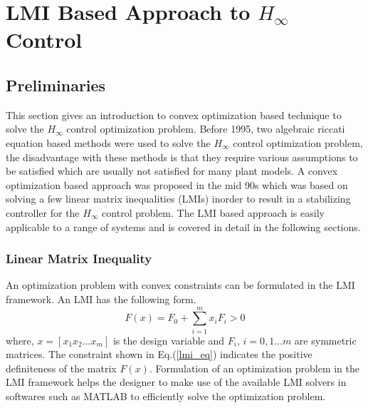 \documentclass[a4paper,12pt]{article}
\begin{document}
\section{LMI Based Approach to $H_{\infty}$ Control}
\subsection{Preliminaries}
This section gives an introduction to  convex optimization based technique to solve the $H_{\infty}$ control optimization problem. Before 1995, two algebraic riccati equation based methods were used to solve the $H_{\infty}$ control optimization problem, the disadvantage with these methods is that they require various assumptions to be satisfied which are usually not satisfied for many plant models. A convex optimization based approach was proposed in the mid 90s which was based on solving a few linear matrix inequalities (LMIs) inorder to result in a stabilizing controller for the $H_{\infty}$ control problem. The LMI based approach is easily applicable to a range of systems and is covered in detail in the following sections.
	\subsubsection{Linear Matrix Inequality}
	An optimization problem with convex constraints can be formulated in the LMI framework. An LMI has the following form.
		\begin{equation}
			\label{lmi_eq}
			F(x)=F_{0}+\sum_{i=1}^{m}x_{i}F_{i} > 0
		\end{equation}
		where, $x=[x_{1} x_{2} ... x_{m}]$ is the design variable and $F_{i}$, $i=0,1...m$ are symmetric matrices. The constraint shown in Eq.(\ref{lmi_eq}) indicates the positive definiteness of the matrix $F(x)$. Formulation of an optimization problem in the LMI framework helps the designer to make use of the available LMI solvers in softwares such as MATLAB to efficiently solve the optimization problem.
\end{document}
